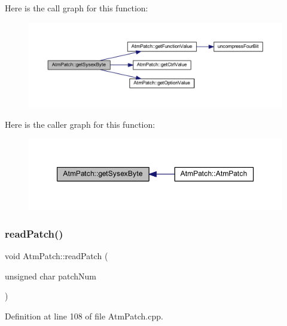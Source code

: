 Here is the call graph for this function\+:
\nopagebreak
\begin{figure}[H]
\begin{center}
\leavevmode
\includegraphics[width=350pt]{d9/de1/class_atm_patch_a48b5b2d71e4b83b80979a68372e935ae_cgraph}
\end{center}
\end{figure}
Here is the caller graph for this function\+:
\nopagebreak
\begin{figure}[H]
\begin{center}
\leavevmode
\includegraphics[width=350pt]{d9/de1/class_atm_patch_a48b5b2d71e4b83b80979a68372e935ae_icgraph}
\end{center}
\end{figure}
\mbox{\label{class_atm_patch_a9689db39f28d3c7d0fcaa6966c82e2d6}} 
\subsubsection{\texorpdfstring{read\+Patch()}{readPatch()}}
{\footnotesize\ttfamily void Atm\+Patch\+::read\+Patch (\begin{DoxyParamCaption}\item[{unsigned char}]{patch\+Num }\end{DoxyParamCaption})}



Definition at line 108 of file Atm\+Patch.\+cpp.


